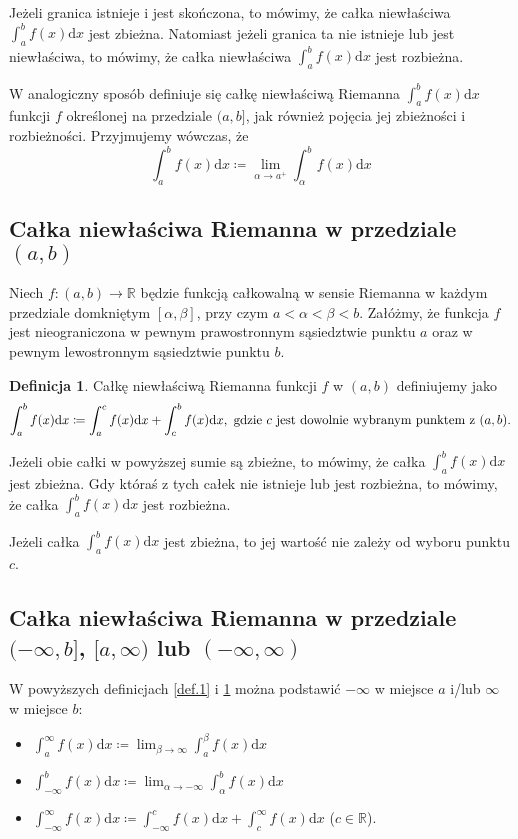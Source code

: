 \documentclass{article}
\numberwithin{equation}{section}
\theoremstyle{definition}
\newtheorem{definition}{Definicja}[section]
\theoremstyle{case}
\begin{document}
	Jeżeli granica istnieje i jest skończona, to mówimy, że całka niewłaściwa ${\int_a^b f(x) \mathrm{d}x }$ jest zbieżna. Natomiast jeżeli granica ta nie istnieje lub jest niewłaściwa, to mówimy, że całka niewłaściwa ${\int_a^b f(x) \mathrm{d}x}$ jest rozbieżna.

W analogiczny sposób definiuje się całkę niewłaściwą Riemanna ${\int_a^b f(x) \mathrm{d}x}$ funkcji $f$ określonej na przedziale ${(a,b]}$, jak również pojęcia jej zbieżności i rozbieżności. Przyjmujemy wówczas, że
\begin{equation*}
	\int_a^b f(x) \mathrm{d}x \coloneqq \lim_{\alpha \to a^+} \int_{\alpha}^b f(x) \mathrm{d}x
\end{equation*}

\subsection{Całka niewłaściwa Riemanna w przedziale $(a,b)$}
Niech ${f \colon (a, b) \to \mathbb{R}}$ będzie funkcją całkowalną w sensie Riemanna
w każdym przedziale domkniętym $[\alpha,\beta]$, przy czym $a < \alpha < \beta < b$.
Załóżmy, że funkcja $f$ jest nieograniczona w pewnym prawostronnym sąsiedztwie punktu $a$ oraz
w pewnym lewostronnym sąsiedztwie punktu $b$.
\begin{definition}
	\label{def.2}
	Całkę niewłaściwą Riemanna funkcji $f$ w $(a,b)$ definiujemy jako
	\begin{equation*}
		\int_a^b f(x) \mathrm{d}x
		\coloneqq
		\int_a^c f(x) \mathrm{d}x + \int_c^b f(x) \mathrm{d}x
		\textnormal{,\enskip gdzie $c$ jest dowolnie wybranym punktem z $(a,b)$.}
	\end{equation*}
\end{definition}
Jeżeli obie całki w powyższej sumie są zbieżne, to mówimy,
że całka $\int_a^b f(x) \mathrm{d}x$ jest zbieżna.
Gdy któraś z tych całek nie istnieje lub jest rozbieżna, to mówimy,
że całka $\int_a^b f(x) \mathrm{d}x$ jest rozbieżna.

Jeżeli całka $\int_a^b f(x) \mathrm{d}x$ jest zbieżna, to jej wartość nie zależy od wyboru punktu $c$.

\subsection{Całka niewłaściwa Riemanna w przedziale
\texorpdfstring{$(-\infty,b]$}{(-inf,b]},
\texorpdfstring{$[a,\infty)$}{[a,+inf)} lub
	\texorpdfstring{$(-\infty,\infty)$}{(-inf,+inf)}
}
W powyższych definicjach \ref{def.1} i \ref{def.2} można podstawić $-\infty$ w miejsce $a$ i/lub $\infty$ w miejsce $b$:
\begin{itemize}
	\item
		$\int_a^{\infty} f(x) \mathrm{d}x
		\coloneqq
		\lim_{\beta \to \infty} \int_a^{\beta} f(x) \mathrm{d}x$
	\item
		$\int_{-\infty}^b f(x) \mathrm{d}x
		\coloneqq
		\lim_{\alpha \to -\infty} \int_{\alpha}^b f(x) \mathrm{d}x$
	\item
		$\int_{-\infty}^{\infty} f(x) \mathrm{d}x
		\coloneqq
		\int_{-\infty}^{c} f(x) \mathrm{d}x + \int_{c}^{\infty} f(x) \mathrm{d}x$ ($c \in \mathbb{R}$).
\end{itemize}
\end{document}
